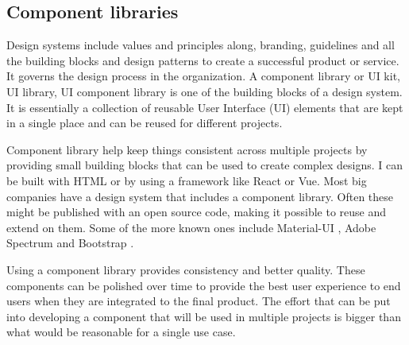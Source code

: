 \documentclass{master_thesis}
\begin{document}

\subsection{Component libraries}

Design systems include values and principles along, branding, guidelines  and all the building blocks and design patterns to create a successful product or service. It governs the design process in the organization. A component library or UI kit, UI library, UI component library is one of the building blocks of a design system.  It is essentially a collection of reusable User Interface (UI) elements that are kept in a single place and can be reused for different projects. \citep{Ramotion2022}

Component library help keep things consistent across multiple projects by providing small building blocks that can be used to create complex designs.  I can be built with HTML or by using a framework like React or Vue. Most big companies have a design system that includes a component library. Often these might be published with an open source code, making it possible to reuse and extend on them. Some of the more known ones include Material-UI \citep{MUS}, Adobe Spectrum \citep{Adobe} and Bootstrap \citep{Collings}.

Using a component library provides consistency and better quality. These components can be polished over time to provide the best user experience to end users when they are integrated to the final product. The effort that can be put into developing a component that will be used in multiple projects is bigger than what would be reasonable for a single use case.
\end{document}
